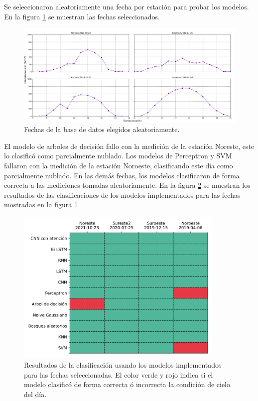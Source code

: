 Se seleccionaron aleatoriamente una fecha por estación para probar los modelos. En la figura \ref{fig:test_daily} se muestran las fechas seleccionados.
\begin{figure}[H]
	\centering
	\includegraphics[width=14cm]{Graphics/test_daily.png}
	\caption{Fechas de la base de datos elegidos aleatoriamente.}
	\label{fig:test_daily}
\end{figure}
El modelo de arboles de decisión fallo con la medición de la estación Noreste, este lo clasificó como parcialmente nublado. Los modelos de Perceptron y SVM fallaron con la medición de la estación Noroeste, clasificando este día como parcialmente nublado. En las demás fechas, los modelos clasificaron de forma correcta a las mediciones tomadas aleatoriamente. En la figura \ref{fig:test_models} se muestran los resultados de las clasificaciones de los modelos implementados para las fechas mostradas en la figura \ref{fig:test_daily}
\begin{figure}[H]
	\centering
	\includegraphics[width=10cm]{Graphics/Test_models.png}
	\caption{Resultados de la clasificación usando los modelos implementados para las fechas seleccionadas. El color verde y rojo indica si el modelo clasificó de forma correcta ó incorrecta la condición de cielo del día.}
	\label{fig:test_models}
\end{figure}
